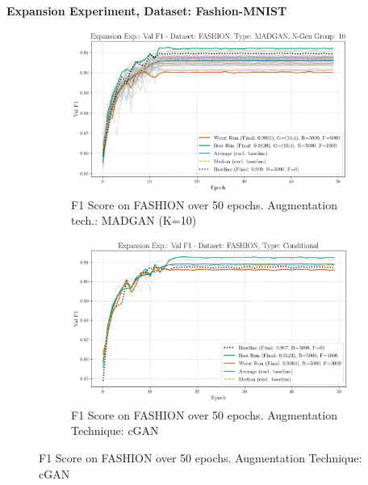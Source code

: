 \newpage
\noindent\textbf{Expansion Experiment, Dataset: Fashion-MNIST}
\begin{figure}[H]
	\centering
	\begin{subfigure}{.85\textwidth}
		\includegraphics[width=\textwidth]{abb/strat_classifier_performance/FASHION_STRATIFIED_CLASSIFIERS_MADGAN_NEW/expansion_experiments/val_f1_score_MADGAN_FASHION_n_gen_10_all.png}
		\caption{F1 Score on FASHION over 50 epochs. Augmentation tech.: MADGAN (K=10)}
        \label{fig:res_expansion_fashion_cgan_vs_madgan__madgan}
	\end{subfigure}
	\begin{subfigure}{.85\textwidth}
		\includegraphics[width=\textwidth]{abb/strat_classifier_performance/FASHION_STRATIFIED_CLASSIFIERS_COND_GAN/expansion_experiments/val_f1_score_['COND']_FASHION_all.png}
		\caption{F1 Score on FASHION over 50 epochs. Augmentation Technique: cGAN}
        \label{fig:res_expansion_fashion_cgan_vs_madgan__cgan}
	\end{subfigure}
\end{figure}

